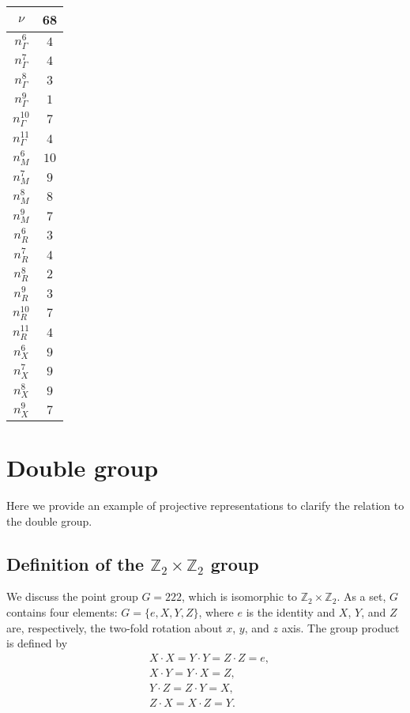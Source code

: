 \documentclass[3p,preprint]{elsarticle}
\begin{document}
\begin{table}[H]
	\begin{tabular}{|c|c|}\hline
		$\nu$ & 68 \\ \hline \hline
		$n_{\Gamma}^{6}$ & $4$\\ \hline
		$n_{\Gamma}^{7}$ & $4$\\ \hline
		$n_{\Gamma}^{8}$ & $3$\\ \hline
		$n_{\Gamma}^{9}$ & $1$\\ \hline
		$n_{\Gamma}^{{10}}$ & $7$\\ \hline
		$n_{\Gamma}^{{11}}$ & $4$\\ \hline \hline
		$n_{M}^{6}$ & $10$\\ \hline
		$n_{M}^{7}$ & $9$\\ \hline
		$n_{M}^{8}$ & $8$\\ \hline
		$n_{M}^{9}$ & $7$\\ \hline \hline
		$n_{R}^{6}$ & $3$\\ \hline
		$n_{R}^{7}$ & $4$\\ \hline
		$n_{R}^{8}$ & $2$\\ \hline
		$n_{R}^{9}$ & $3$\\ \hline
		$n_{R}^{{10}}$ & $7$\\ \hline 
		$n_{R}^{{11}}$ & $4$\\ \hline  \hline
		$n_{X}^{6}$ & $9$\\ \hline
		$n_{X}^{7}$ & $9$\\ \hline
		$n_{X}^{8}$ & $9$\\ \hline
		$n_{X}^{9}$ & $7$\\ \hline
	\end{tabular}
\end{table}

\section{Double group}
\label{appPR}
Here we provide an example of projective representations to clarify the relation to the double group.
\subsection{Definition of the $\mathbb{Z}_2\times\mathbb{Z}_2$ group}
We discuss the point group $G=222$, which is isomorphic to $\mathbb{Z}_2\times\mathbb{Z}_2$. 
As a set, $G$ contains four elements: $G=\{e,X,Y,Z\}$, where $e$ is the identity and $X$, $Y$, and $Z$ are, respectively, the two-fold rotation about $x$, $y$, and $z$ axis.
The group product is defined by
\begin{eqnarray}
&X\cdot X=Y\cdot Y=Z\cdot Z=e,\\
&X\cdot Y=Y\cdot X=Z,\\
&Y\cdot Z=Z\cdot Y=X,\\
&Z\cdot X=X\cdot Z=Y.
\end{eqnarray}
\end{document}

